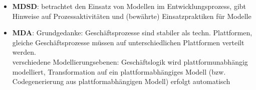 \begin{itemize}
    \item \textbf{MDSD}: betrachtet den Einsatz von Modellen im Entwicklungsprozess, gibt Hinweise auf Prozessaktivitäten und (bewährte) Einsatzpraktiken für Modelle
    \item \textbf{MDA}: Grundgedanke: Geschäftsprozesse sind stabiler als {techn.} Plattformen, gleiche Geschäftsprozesse müssen auf unterschiedlichen Plattformen verteilt werden.\\
    \rightarrow verschiedene Modellierungsebenen: Geschäftslogik wird plattformunabhängig modelliert, Transformation auf ein plattformabhängiges Modell (bzw. Codegenerierung aus plattformabhängigen Modell) erfolgt automatisch
\end{itemize}
